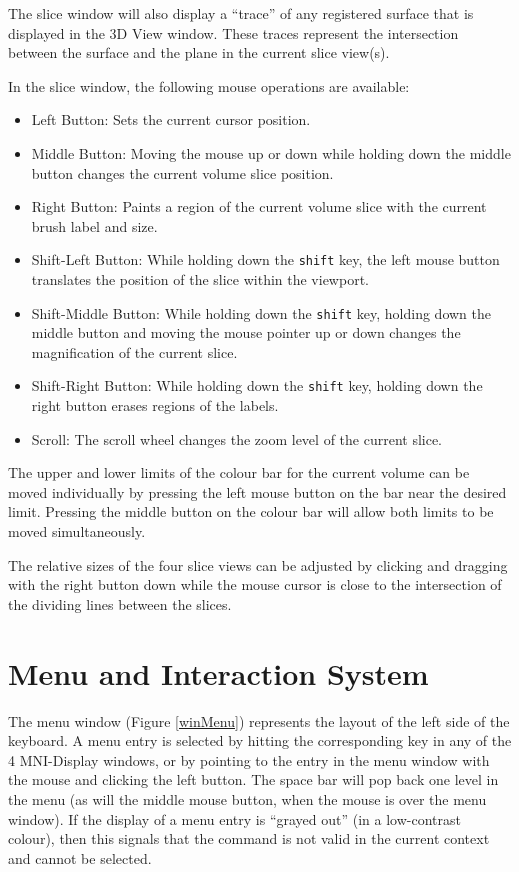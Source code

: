 \documentclass[11pt,letterpaper]{article}
\newcommand{\ident}[1]{{\tt #1}}
\newcommand{\display}{\mbox{MNI-Display}}
\begin{document}
The slice window will also display a ``trace'' of any registered
surface that is displayed in the 3D View window. These traces
represent the intersection between the surface and the plane in the
current slice view(s).

In the slice window, the following mouse operations are available:

\begin{itemize}
\item Left Button: Sets the current cursor position.
\item Middle Button: Moving the mouse up or down while holding down
  the middle button changes the current volume slice position.
\item Right Button: Paints a region of the current volume slice with the
current brush label and size.
\item Shift-Left Button: While holding down the \ident{shift} key, the
  left mouse button translates the position of the slice within the
  viewport.
\item Shift-Middle Button: While holding down the \ident{shift} key,
  holding down the middle button and moving the mouse pointer up or down
  changes the magnification of the current slice.
\item Shift-Right Button: While holding down the \ident{shift} key,
  holding down the right button erases regions of the labels.
\item Scroll: The scroll wheel changes the zoom level of the current slice.
\end{itemize}

The upper and lower limits of the colour bar for the current volume
can be moved individually by pressing the left mouse button on the bar
near the desired limit. Pressing the middle button on the colour bar
will allow both limits to be moved simultaneously.

The relative sizes of the four slice views can be adjusted by clicking
and dragging with the right button down while the mouse cursor is
close to the intersection of the dividing lines between the slices.

\section{Menu and Interaction System}

The menu window (Figure \ref{winMenu}) represents the
layout of the left side of the keyboard.  A menu entry is selected by
hitting the corresponding key in any of the 4 \display{} windows, or
by pointing to the entry in the menu window with the mouse and
clicking the left button. The space bar will pop back one level in the
menu (as will the middle mouse button, when the mouse is over the menu
window). If the display of a menu entry is ``grayed out'' (in a
low-contrast colour), then this signals that the command is not valid
in the current context and cannot be selected.
\end{document}
